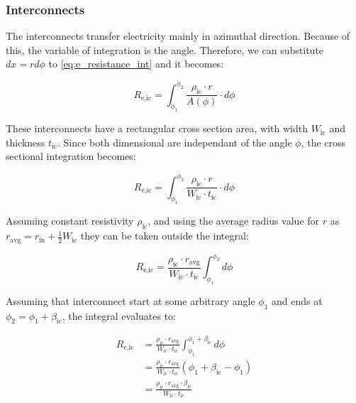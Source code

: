 \documentclass[10pt,a4paper,twocolumn]{article}
\begin{document}
\subsubsection{Interconnects}

The interconnects transfer electricity mainly in azimuthal direction. Because of this, the variable of integration is the angle. Therefore, we can substitute $dx=rd\phi$ to \cref{eq:e_resistance_int} and it becomes:

\begin{equation}
	R_{\text{e,ic}} = \int_{\phi_1}^{\phi_2} \frac{\rho_{\text{ic}}\cdot r}{A(\phi)}\cdot d\phi
\end{equation}


These interconnects have a rectangular cross section area, with width $W_{\text{ic}}$ and thickness $t_{\text{ic}}$. Since both dimensional are independant of the angle $\phi$, the cross sectional integration becomes:

\begin{equation*}
	R_{\text{e,ic}} = \int_{\phi_1}^{\phi_2} \frac{\rho_{\text{ic}}\cdot r}{W_{\text{ic}} \cdot t_{\text{ic}}} \cdot d\phi
\end{equation*}

Assuming constant resistivity $\rho_{\text{ic}}$, and using the average radius value for $r$ as $r_{\text{avg}}=r_{\text{in}}+\frac{1}{2}W_{\text{ic}}$ they can be taken outside the integral:

\begin{equation*}
	R_{\text{e,ic}} = \frac{\rho_{\text{ic}}\cdot r_{\text{avg}}}{W_{\text{ic}} \cdot t_{\text{ic}}} \int_{\phi_1}^{\phi_2} d\phi
\end{equation*}

Assuming that interconnect start at some arbitrary angle $\phi_1$ and ends at $\phi_2 = \phi_1 + \beta_{\text{ic}}$, the integral evaluates to:

\begin{equation*}
	\begin{aligned}
		R_{\text{e,ic}} & =  \frac{\rho_{\text{ic}}\cdot r_{\text{avg}}}{W_{\text{ic}} \cdot t_{\text{ic}}}  \int_{\phi_1}^{\phi_1 + \beta_{\text{ic}}}d\phi \\
		                & = \frac{\rho_{\text{ic}} \cdot r_{\text{avg}} }{W_{\text{ic}} \cdot t_{\text{ic}}}(\phi_1 + \beta_{\text{ic}} - \phi_1)            \\
		                & = \frac{\rho_{\text{ic}} \cdot r_{\text{avg}} \cdot \beta_{\text{ic}}}{W_{\text{ic}} \cdot t_{\text{ic}}}
	\end{aligned}
\end{equation*}
\end{document}
